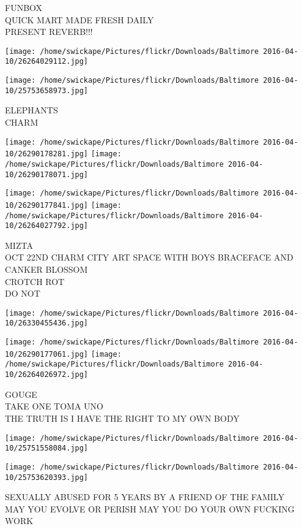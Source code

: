 \documentclass[10pt,letterpaper]{article}
\begin{document}
FUNBOX\\
QUICK MART MADE FRESH DAILY\\
PRESENT REVERB!!!
\pagebreak

\texttt{[image: /home/swickape/Pictures/flickr/Downloads/Baltimore 2016-04-10/26264029112.jpg]}

\vspace{0.25in}
\texttt{[image: /home/swickape/Pictures/flickr/Downloads/Baltimore 2016-04-10/25753658973.jpg]}

ELEPHANTS\\
CHARM
\pagebreak

\texttt{[image: /home/swickape/Pictures/flickr/Downloads/Baltimore 2016-04-10/26290178281.jpg]}
\texttt{[image: /home/swickape/Pictures/flickr/Downloads/Baltimore 2016-04-10/26290178071.jpg]}

\texttt{[image: /home/swickape/Pictures/flickr/Downloads/Baltimore 2016-04-10/26290177841.jpg]}
\texttt{[image: /home/swickape/Pictures/flickr/Downloads/Baltimore 2016-04-10/26264027792.jpg]}

MIZTA\\
OCT 22ND CHARM CITY ART SPACE WITH BOYS BRACEFACE AND CANKER BLOSSOM\\
CROTCH ROT\\
DO NOT
\pagebreak

\texttt{[image: /home/swickape/Pictures/flickr/Downloads/Baltimore 2016-04-10/26330455436.jpg]}

\vspace{0.25in}
\texttt{[image: /home/swickape/Pictures/flickr/Downloads/Baltimore 2016-04-10/26290177061.jpg]}
\texttt{[image: /home/swickape/Pictures/flickr/Downloads/Baltimore 2016-04-10/26264026972.jpg]}

GOUGE\\
TAKE ONE TOMA UNO\\
THE TRUTH IS I HAVE THE RIGHT TO MY OWN BODY
\pagebreak

\texttt{[image: /home/swickape/Pictures/flickr/Downloads/Baltimore 2016-04-10/25751558084.jpg]}

\vspace{0.25in}
\texttt{[image: /home/swickape/Pictures/flickr/Downloads/Baltimore 2016-04-10/25753620393.jpg]}

SEXUALLY ABUSED FOR 5 YEARS BY A FRIEND OF THE FAMILY\\
MAY YOU EVOLVE OR PERISH MAY YOU DO YOUR OWN FUCKING WORK
\pagebreak
\end{document}
